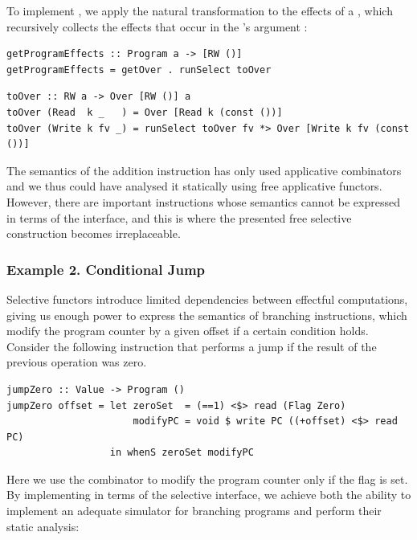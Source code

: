 \noindent
To implement , we apply the natural transformation
 to the effects of a , which recursively collects the
effects that occur in the 's argument :

\vspace{1mm}
\begin{verbatim}
getProgramEffects :: Program a -> [RW ()]
getProgramEffects = getOver . runSelect toOver
\end{verbatim}
\vspace{1mm}
\begin{verbatim}
toOver :: RW a -> Over [RW ()] a
toOver (Read  k _   ) = Over [Read k (const ())]
toOver (Write k fv _) = runSelect toOver fv *> Over [Write k fv (const ())]
\end{verbatim}
\vspace{1mm}

\noindent
The semantics of the addition instruction has only used applicative combinators
and we thus could have analysed it statically using free applicative functors.
However, there are important instructions whose semantics cannot be expressed
in terms of the  interface, and this is where the presented
free selective construction becomes irreplaceable.

\subsubsection{Example 2. Conditional Jump}

Selective functors introduce limited dependencies between effectful
computations, giving us enough power to express the semantics of branching
instructions, which modify the program counter by a given offset if a certain
condition holds. Consider the following instruction that performs a jump if the
result of the previous operation was zero.

\vspace{1mm}
\begin{verbatim}
jumpZero :: Value -> Program ()
jumpZero offset = let zeroSet  = (==1) <$> read (Flag Zero)
                      modifyPC = void $ write PC ((+offset) <$> read PC)
                  in whenS zeroSet modifyPC
\end{verbatim}
\vspace{1mm}

\noindent
Here we use the  combinator to modify the program counter only if
the  flag is set. By implementing  in terms of the
selective interface, we achieve both the ability to implement an adequate
simulator for branching programs and perform their static analysis:

